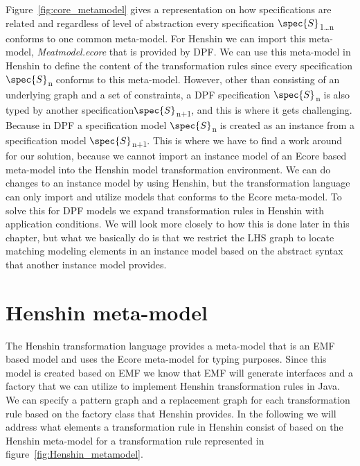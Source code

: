Figure~\ref{fig:core_metamodel} gives a representation on how specifications
are related and regardless of level of abstraction every specification
$\spec{S}$\textsubscript{1\ldots n} conforms to one common meta-model. For
Henshin we can import this meta-model, \textit{Meatmodel.ecore} that is
provided by DPF. We can use this meta-model in Henshin to define the
content of the transformation rules since every specification
$\spec{S}$\textsubscript{n} conforms to this meta-model. However, other than
consisting of an underlying graph and a set of constraints, a DPF specification
$\spec{S}$\textsubscript{n} is also typed by another
specification$\spec{S}$\textsubscript{n+1}, and this is where it gets
challenging. Because in DPF a specification model $\spec{S}$\textsubscript{n} is
created as an instance from a specification model $\spec{S}$\textsubscript{n+1}.
This is where we have to find a work around for our solution, because we cannot
import an instance model of an Ecore based meta-model into the Henshin model
transformation environment. We can do changes to an instance model by using
Henshin, but the transformation language can only import and utilize models
that conforms to the Ecore meta-model. To solve this for DPF models we expand
transformation rules in Henshin with application conditions. We will look more
closely to how this is done later in this chapter, but what we basically do is
that we restrict the LHS graph to locate matching modeling elements in an
instance model based on the abstract syntax that another instance model
provides. 


\section{Henshin meta-model}
\label{sec:henshin_meta}

The Henshin transformation language provides a meta-model that is an EMF based
model and uses the Ecore meta-model for typing purposes\cite{Arendt2010}. Since
this model is created based on EMF we know that EMF will generate interfaces and
a factory that we can utilize to implement Henshin transformation rules in Java.
We can specify a pattern graph and a replacement graph for each transformation
rule based on the factory class that Henshin provides. In the following we
will address what elements a transformation rule in Henshin consist of based on
the Henshin meta-model for a transformation rule represented in
figure~\ref{fig:Henshin_metamodel}.
 

